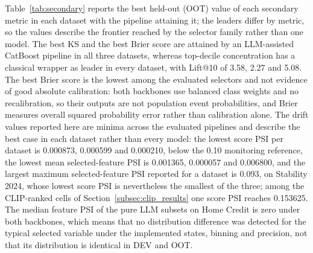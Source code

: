 \documentclass[final,5p,twocolumn]{elsarticle}
\begin{document}
Table~\ref{tab:secondary} reports the best held-out (OOT) value of each secondary metric in each dataset with the pipeline attaining it; the leaders differ by metric, so the values describe the frontier reached by the selector family rather than one model. The best KS and the best Brier score are attained by an LLM-assisted CatBoost pipeline in all three datasets, whereas top-decile concentration has a classical wrapper as leader in every dataset, with Lift@10 of 3.58, 2.27 and 5.08. The best Brier score is the lowest among the evaluated selectors and not evidence of good absolute calibration: both backbones use balanced class weights and no recalibration, so their outputs are not population event probabilities, and Brier measures overall squared probability error rather than calibration alone. The drift values reported here are minima across the evaluated pipelines and describe the best case in each dataset rather than every model: the lowest score PSI per dataset is 0.000873, 0.000599 and 0.000210, below the 0.10 monitoring reference, the lowest mean selected-feature PSI is 0.001365, 0.000057 and 0.006800, and the largest maximum selected-feature PSI reported for a dataset is 0.093, on Stability 2024, whose lowest score PSI is nevertheless the smallest of the three; among the CLIP-ranked cells of Section~\ref{subsec:clip_results} one score PSI reaches 0.153625. The median feature PSI of the pure LLM subsets on Home Credit is zero under both backbones, which means that no distribution difference was detected for the typical selected variable under the implemented states, binning and precision, not that its distribution is identical in DEV and OOT.
\end{document}
